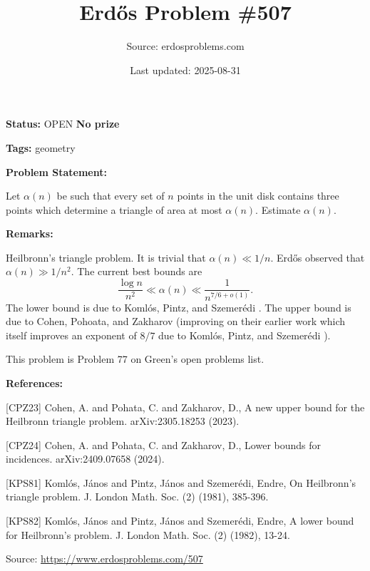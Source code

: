 \documentclass{article}
\title{Erd\H{o}s Problem \#507}
\date{Last updated: 2025-08-31}
\author{Source: erdosproblems.com}
\begin{document}
\maketitle

\noindent\textbf{Status:} OPEN \quad \textbf{No prize}

\noindent\textbf{Tags:} geometry

\medskip
\noindent\textbf{Problem Statement:}

Let $\alpha(n)$ be such that every set of $n$ points in the unit disk contains three points which determine a triangle of area at most $\alpha(n)$. Estimate $\alpha(n)$.

\bigskip
\noindent\textbf{Remarks:}

Heilbronn's triangle problem. It is trivial that $\alpha(n) \ll 1/n$. Erd\H{o}s observed that $\alpha(n)\gg 1/n^2$. The current best bounds are\[\frac{\log n}{n^2}\ll \alpha(n) \ll \frac{1}{n^{7/6+o(1)}}.\]The lower bound is due to Koml\'{o}s, Pintz, and Szemer\'{e}di \cite{KPS82}. The upper bound is due to Cohen, Pohoata, and Zakharov \cite{CPZ24} (improving on their earlier work \cite{CPZ23} which itself improves an exponent of $8/7$ due to Koml\'{o}s, Pintz, and Szemer\'{e}di \cite{KPS81}).

This problem is Problem 77 on Green's open problems list.

\bigskip
\noindent\textbf{References:}

[CPZ23] Cohen, A. and Pohata, C. and Zakharov, D., A new upper bound for the Heilbronn triangle problem. arXiv:2305.18253 (2023).
 
 [CPZ24] Cohen, A. and Pohata, C. and Zakharov, D., Lower bounds for incidences. arXiv:2409.07658 (2024).
 
 [KPS81] Koml\'{o}s, J\'{a}nos and Pintz, J\'{a}nos and Szemer\'{e}di, Endre, On Heilbronn's triangle problem. J. London Math. Soc. (2) (1981), 385-396.
 
 [KPS82] Koml\'{o}s, J\'{a}nos and Pintz, J\'{a}nos and Szemer\'{e}di, Endre, A lower bound for Heilbronn's problem. J. London Math. Soc. (2) (1982), 13-24.

\bigskip
\noindent\small{Source: \url{https://www.erdosproblems.com/507}}
\end{document}
